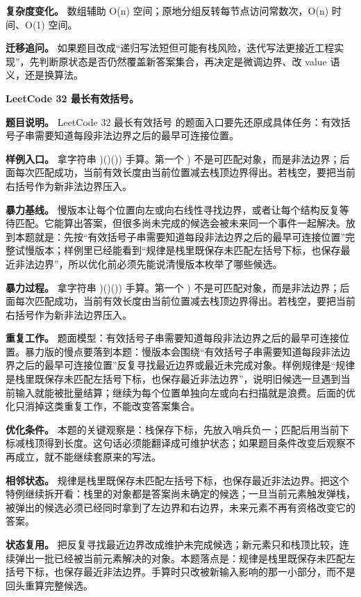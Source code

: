\textbf{复杂度变化。} 数组辅助 O(n) 空间；原地分组反转每节点访问常数次，O(n) 时间、O(1) 空间。

\textbf{迁移追问。} 如果题目改成“递归写法短但可能有栈风险，迭代写法更接近工程实现”，先判断原状态是否仍然覆盖新答案集合，再决定是微调边界、改 value 语义，还是换算法。

\noindent\textbf{LeetCode 32 最长有效括号。}

\textbf{题目说明。} LeetCode 32 最长有效括号 的题面入口要先还原成具体任务：有效括号子串需要知道每段非法边界之后的最早可连接位置。

\textbf{样例入口。} 拿字符串 )()()) 手算。第一个 ) 不是可匹配对象，而是非法边界；后面每次匹配成功，当前有效长度由当前位置减去栈顶边界得出。若栈空，要把当前右括号作为新非法边界压入。

\textbf{暴力基线。} 慢版本让每个位置向左或向右线性寻找边界，或者让每个结构反复等待匹配。它能算出答案，但很多尚未完成的候选会被未来同一个事件一起解决。放到本题就是：先按“有效括号子串需要知道每段非法边界之后的最早可连接位置”完整试慢版本；样例里已经能看到“规律是栈里既保存未匹配左括号下标，也保存最近非法边界”，所以优化前必须先能说清慢版本枚举了哪些候选。

\textbf{暴力过程。} 拿字符串 )()()) 手算。第一个 ) 不是可匹配对象，而是非法边界；后面每次匹配成功，当前有效长度由当前位置减去栈顶边界得出。若栈空，要把当前右括号作为新非法边界压入。

\textbf{重复工作。} 题面模型：有效括号子串需要知道每段非法边界之后的最早可连接位置。暴力版的慢点要落到本题：慢版本会围绕“有效括号子串需要知道每段非法边界之后的最早可连接位置”反复寻找最近边界或最近未完成对象。样例规律是“规律是栈里既保存未匹配左括号下标，也保存最近非法边界”，说明旧候选一旦遇到当前输入就能被批量结算；继续为每个位置单独向左或向右扫描就是浪费。后面的优化只消掉这类重复工作，不能改变答案集合。

\textbf{优化条件。} 本题的关键观察是：栈保存下标，先放入哨兵负一；匹配后用当前下标减栈顶得到长度。这句话必须能翻译成可维护状态；如果题目条件改变后观察不再成立，就不能继续套原来的写法。

\textbf{相邻状态。} 规律是栈里既保存未匹配左括号下标，也保存最近非法边界。把这个特例继续拆开看：栈里的对象都是答案尚未确定的候选；一旦当前元素触发弹栈，被弹出的候选必须已经同时拿到了左边界和右边界，未来元素不再有资格改变它的答案。

\textbf{状态复用。} 把反复寻找最近边界改成维护未完成候选；新元素只和栈顶比较，连续弹出一批已经被当前元素解决的对象。本题落点是：规律是栈里既保存未匹配左括号下标，也保存最近非法边界。手算时只改被新输入影响的那一小部分，而不是回头重算完整候选。

